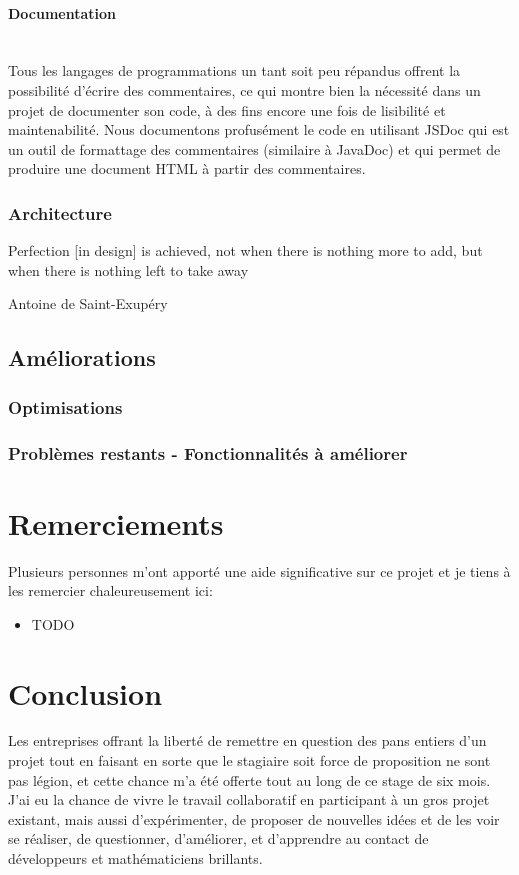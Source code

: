 \documentclass[a4paper,french,12pt]{article}
\begin{document}
	\paragraph{Documentation}~\\	
		Tous les langages de programmations un tant soit peu répandus offrent la possibilité d'écrire des commentaires, ce qui montre bien la nécessité dans un projet de documenter son code, à des fins encore une fois de lisibilité et maintenabilité.
		Nous documentons profusément le code en utilisant JSDoc qui est un outil de formattage des commentaires (similaire à JavaDoc) et qui permet de produire une document HTML à partir des commentaires.

	\subsubsection{Architecture}
	\epigraph{Perfection [in design] is achieved, not when there is nothing more to add, but when there is nothing left to take away}{Antoine de Saint-Exupéry}


  \subsection{Améliorations}
	\subsubsection{Optimisations}
   

    \subsubsection{Problèmes restants - Fonctionnalités à améliorer}
   


\section{Remerciements}

	Plusieurs personnes m’ont apporté une aide significative sur ce projet et je tiens à les remercier chaleureusement ici:

	\begin{itemize}
		  	\item TODO
	\end{itemize}

\section{Conclusion}
	Les entreprises offrant la liberté de remettre en question des pans entiers d'un projet tout en faisant en sorte que le stagiaire soit force de proposition ne sont pas légion, et cette chance m'a été offerte tout au long de ce stage de six mois.
J'ai eu la chance de vivre le travail collaboratif en participant à un gros projet existant, mais aussi d'expérimenter, de proposer de nouvelles idées et de les voir se réaliser, de questionner, d'améliorer, et d'apprendre au contact de développeurs et mathématiciens brillants.~\\
\end{document}
